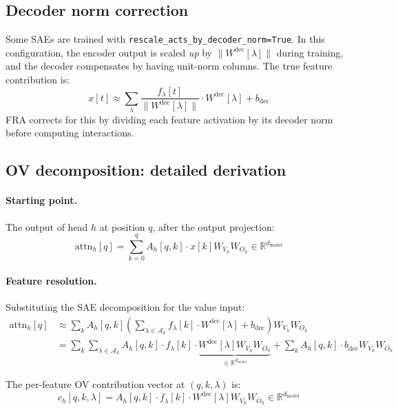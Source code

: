 \documentclass{article}
\theoremstyle{plain}
\theoremstyle{definition}
\theoremstyle{remark}
\newcommand{\Wdec}{W^{\mathrm{dec}}}
\newcommand{\dmodel}{d_{\mathrm{model}}}
\newcommand{\flambda}{f_\lambda}
\newcommand{\RR}{\mathbb{R}}
\begin{document}
\subsection{Decoder norm correction}
\label{app:dec_norm}

Some SAEs are trained with \texttt{rescale\_acts\_by\_decoder\_norm=True}. In this configuration, the encoder output is scaled \emph{up} by $\|\Wdec[\lambda]\|$ during training, and the decoder compensates by having unit-norm columns. The true feature contribution is:
\begin{equation}
    x[t] \approx \sum_\lambda \frac{\flambda[t]}{\|\Wdec[\lambda]\|} \cdot \Wdec[\lambda] + b_{\mathrm{dec}}
\end{equation}
FRA corrects for this by dividing each feature activation by its decoder norm before computing interactions.

\subsection{OV decomposition: detailed derivation}
\label{app:ov_derivation}

\paragraph{Starting point.} The output of head $h$ at position $q$, after the output projection:
\begin{equation}
    \mathrm{attn}_h[q] = \sum_{k=0}^{q} A_h[q,k] \cdot x[k] W_{V_h} W_{O_h} \in \RR^{\dmodel}
\end{equation}

\paragraph{Feature resolution.} Substituting the SAE decomposition for the value input:
\begin{align}
    \mathrm{attn}_h[q] &\approx \sum_k A_h[q,k] \left( \sum_{\lambda \in \mathcal{A}_k} \flambda[k] \cdot \Wdec[\lambda] + b_{\mathrm{dec}} \right) W_{V_h} W_{O_h} \\
    &= \sum_k \sum_{\lambda \in \mathcal{A}_k} A_h[q,k] \cdot \flambda[k] \cdot \underbrace{\Wdec[\lambda] W_{V_h} W_{O_h}}_{\in \RR^{\dmodel}} + \sum_k A_h[q,k] \cdot b_{\mathrm{dec}} W_{V_h} W_{O_h}
\end{align}

The per-feature OV contribution vector at $(q, k, \lambda)$ is:
\begin{equation}
    c_h[q, k, \lambda] = A_h[q,k] \cdot \flambda[k] \cdot \Wdec[\lambda] W_{V_h} W_{O_h} \in \RR^{\dmodel}
\end{equation}
\end{document}
